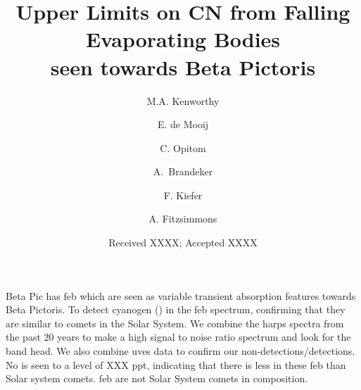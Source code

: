 \documentclass{aa}
\newcommand{\bp}{Beta Pictoris}
\begin{document}
 


   \title{Upper Limits on CN from Falling Evaporating Bodies\\seen towards \bp{}}

   \author{M.A. Kenworthy
          \and
          E. de Mooij
          \and
          C. Opitom
          \and
          A.\ Brandeker
          \and 
          F. Kiefer
          \and
          A. Fitzsimmons 
          }


   \date{Received XXXX; Accepted XXXX}

 
  \abstract
   {Beta Pic has \ac{feb} which are seen as variable transient absorption features towards \bp{}.}
   {To detect cyanogen () in the \ac{feb} spectrum, confirming that they are similar to comets in the Solar System.}
   {We combine the \ac{harps} spectra from the past 20 years to make a high signal to noise ratio spectrum and look for the  band head. We also combine \ac{uves} data to confirm our non-detections/detections.}
   {No  is seen to a level of XXX ppt, indicating that there is less  in these \ac{feb} than Solar system comets.}
   {\ac{feb} are not Solar System comets in composition.}


   \maketitle
%
\end{document}
